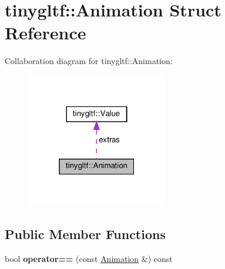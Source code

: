 \hypertarget{structtinygltf_1_1Animation}{}\section{tinygltf\+:\+:Animation Struct Reference}
\label{structtinygltf_1_1Animation}


Collaboration diagram for tinygltf\+:\+:Animation\+:\nopagebreak
\begin{figure}[H]
\begin{center}
\leavevmode
\includegraphics[width=175pt]{structtinygltf_1_1Animation__coll__graph}
\end{center}
\end{figure}
\subsection*{Public Member Functions}
\begin{DoxyCompactItemize}
\item 
\mbox{\label{structtinygltf_1_1Animation_a24ef0cc60da7154d4b78e2f152b640c3}} 
bool {\bfseries operator==} (const \hyperlink{structtinygltf_1_1Animation}{Animation} \&) const
\end{DoxyCompactItemize}
